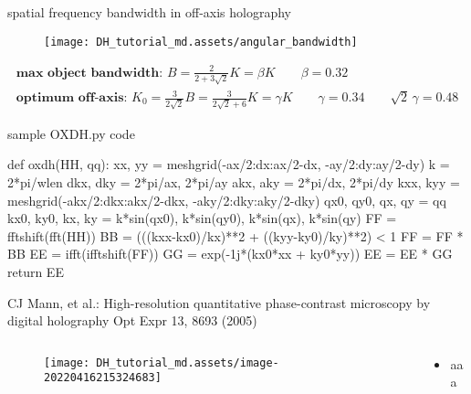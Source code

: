 \documentclass[t, aspectratio=169]{beamer}
\begin{document}
\begin{frame}{spatial frequency bandwidth in off-axis holography}
	\begin{figure}
		\texttt{[image: DH\_tutorial\_md.assets/angular\_bandwidth]}
	\end{figure}
	\begin{gather*}
\textbf{max object bandwidth:     } B = \frac{2}{2+3\sqrt{2}}K = \beta K \qquad \beta=0.32 \\
\textbf{optimum off-axis:   } K_0 = \frac{3}{2\sqrt{2}}B = \frac{3}{2\sqrt{2}+6} K = \gamma K \qquad \gamma=0.34 \qquad \sqrt{2}\,\gamma = 0.48 
	\end{gather*}
\end{frame}


\begin{frame}[fragile]{sample OXDH.py code}
	\begin{semiverbatim}
def oxdh(HH, qq):
    xx, yy = meshgrid(-ax/2:dx:ax/2-dx, -ay/2:dy:ay/2-dy)
    k = 2*pi/wlen
    dkx, dky = 2*pi/ax, 2*pi/ay
    akx, aky = 2*pi/dx, 2*pi/dy
    kxx, kyy = meshgrid(-akx/2:dkx:akx/2-dkx, -aky/2:dky:aky/2-dky)
    qx0, qy0, qx, qy = qq	%
    kx0, ky0, kx, ky = k*sin(qx0), k*sin(qy0), k*sin(qx), k*sin(qy)   
    FF = fftshift(fft(HH))    
    BB = (((kxx-kx0)/kx)**2 + ((kyy-ky0)/ky)**2) < 1
    FF = FF * BB
    EE = ifft(ifftshift(FF)) 
    GG = exp(-1j*(kx0*xx + ky0*yy))
    EE = EE * GG    
    return EE
	\end{semiverbatim}
\end{frame}


\begin{frame}{CJ Mann, et al.: High-resolution quantitative phase-contrast microscopy by digital holography}
	\vspace{-3 mm}
	\small Opt Expr 13, 8693 (2005)
	\begin{columns}
		\begin{column}{.6\textwidth}
			\begin{figure}
				\texttt{[image: DH\_tutorial\_md.assets/image-20220416215324683]}
			\end{figure}
		\end{column}
		\begin{column}{.4\textwidth}
			\begin{itemize}
				\item aaa
			\end{itemize}
		\end{column}
	\end{columns}
\end{frame}
\end{document}
